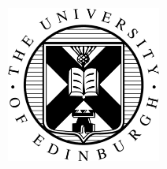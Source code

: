 
\begin{titlepage}

\begin{addmargin}[-1cm]{-3cm}
\begin{center}
\large

\hfill
\vfill

\begingroup
\color{Maroon}\spacedallcaps{\myTitle} \\ \spacedallcaps{\mySubtitle} \\ \bigskip 
\endgroup

\spacedlowsmallcaps{\myName} %
\vfill

\includegraphics[width=4cm]{eushield-normal} \\ \medskip %
\vfill

\myDegree \\
\myDepartment \\
\myUni \\ \bigskip

\myTime 



\end{center}
\end{addmargin}

\end{titlepage}